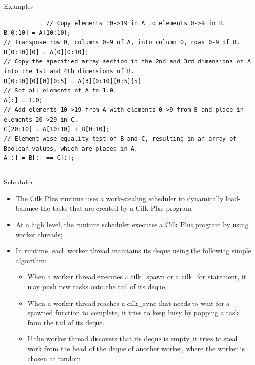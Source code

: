 \documentclass{beamer}
\begin{document}
\subsection{}
\begin{frame}[fragile]
	\begin{block}{Examples}
		\begin{lstlisting}
			// Copy elements 10->19 in A to elements 0->9 in B.
B[0:10] = A[10:10];
// Transpose row 0, columns 0-9 of A, into column 0, rows 0-9 of B.
B[0:10][0] = A[0][0:10];
// Copy the specified array section in the 2nd and 3rd dimensions of A into the 1st and 4th dimensions of B.
B[0:10][0][0][0:5] = A[3][0:10][0:5][5]
// Set all elements of A to 1.0.
A[:] = 1.0;
// Add elements 10->19 from A with elements 0->9 from B and place in elements 20->29 in C.
C[20:10] = A[10:10] + B[0:10];
// Element-wise equality test of B and C, resulting in an array of Boolean values, which are placed in A.
A[:] = B[:] == C[:];
		\end{lstlisting}
	\end{block}
\end{frame}

\subsection{}
\begin{frame}[fragile]
	\begin{block}{Scheduler}
		\begin{itemize}
			\item The Cilk Plus runtime uses a work-stealing scheduler to dynamically load-balance the tasks that are created by a Cilk Plus program;
			\item At a high level, the runtime scheduler executes a Cilk Plus program by using worker threads;
			\item In runtime, each worker thread maintains its deque using the following simple algorithm:
			\begin{itemize}
				\item When a worker thread executes a cilk\_spawn or a cilk\_for statement, it may push new tasks onto the tail of its deque.
				\item When a worker thread reaches a cilk\_sync that needs to wait for a spawned function to complete, it tries to keep busy by popping a task from the tail of its deque.
				\item If the worker thread discovers that its deque is empty, it tries to steal work from the head of the deque of another worker, where the worker is chosen at random.
			\end{itemize}
		\end{itemize}
	\end{block}
\end{frame}
\end{document}

